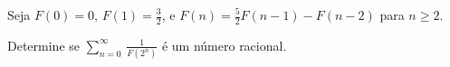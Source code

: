 Seja \(F(0)=0\), \(F(1)=\frac{3}{2}\), e \(F(n)=\frac{5}{2}F(n-1)-F(n-2)\) para \(n\ge2\).

Determine se \(\displaystyle{\sum_{n=0}^{\infty}\,
    \frac{1}{F(2^n)}}\) é um número racional.
